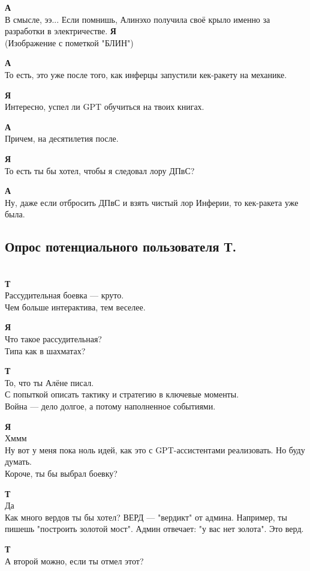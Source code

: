 \textbf{А} \\
В смысле, ээ... Если помнишь, Алинэхо получила своё крыло именно за разработки в электричестве.
\textbf{Я} \\
(Изображение с пометкой "БЛИН")

\textbf{А} \\
То есть, это уже после того, как инферцы запустили кек-ракету на механике.

\textbf{Я} \\
Интересно, успел ли GPT обучиться на твоих книгах.

\textbf{А} \\
Причем, на десятилетия после.

\textbf{Я} \\
То есть ты бы хотел, чтобы я следовал лору ДПвС?

\textbf{А} \\
Ну, даже если отбросить ДПвС и взять чистый лор Инферии, то кек-ракета уже была.
\subsection{Опрос потенциального пользователя Т.}\\
\textbf{Т} \\
Рассудительная боевка — круто. \\
Чем больше интерактива, тем веселее.

\textbf{Я} \\
Что такое рассудительная? \\
Типа как в шахматах?

\textbf{Т} \\
То, что ты Алёне писал. \\
С попыткой описать тактику и стратегию в ключевые моменты. \\
Война — дело долгое, а потому наполненное событиями.

\textbf{Я} \\
Хммм \\
Ну вот у меня пока ноль идей, как это с GPT-ассистентами реализовать. Но буду думать. \\
Короче, ты бы выбрал боевку?

\textbf{Т} \\
Да \\
Как много вердов ты бы хотел? ВЕРД — "вердикт" от админа. Например, ты пишешь "построить золотой мост". Админ отвечает: "у вас нет золота". Это верд.

\textbf{Т} \\
А второй можно, если ты отмел этот?

